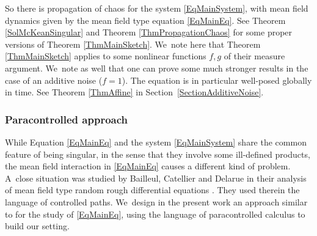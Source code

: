 \documentclass[10pt]{amsart}
\theoremstyle{definition}
\begin{document}
So there is propagation of chaos for the system \eqref{EqMainSystem}, with mean field dynamics given by the mean field type equation \eqref{EqMainEq}. See Theorem \ref{SolMcKeanSingular} and Theorem \ref{ThmPropagationChaos} for some proper versions of Theorem \ref{ThmMainSketch}. We~note here that Theorem \ref{ThmMainSketch} applies to some nonlinear functions $f,g$ of their measure argument. We~note as well that one can prove some much stronger results in the case of an additive noise ($f=1$). The equation is in particular well-posed globally in time. See Theorem \ref{ThmAffine} in Section~\ref{SectionAdditiveNoise}.

\subsubsection{Paracontrolled approach} While Equation \eqref{EqMainEq} and the system \eqref{EqMainSystem} share the common feature of being singular, in the sense that they involve some ill-defined products, the mean field interaction in \eqref{EqMainEq} causes a different kind of problem. A~close situation was studied by Bailleul, Catellier and Delarue in their analysis of mean field type random rough differential equations \cite{BailleulCatellierDelarue}. They used therein the language of controlled paths. We~design in the present work an approach similar to \cite{BailleulCatellierDelarue,roughchaos} for the study of \eqref{EqMainEq}, using the language of paracontrolled calculus to build our setting.
\end{document}

